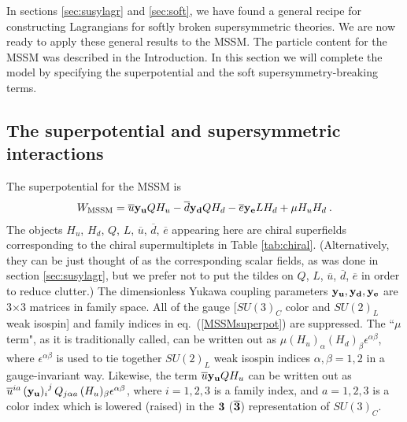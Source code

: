 \documentclass[11pt]{article}
\def\beq{\begin{eqnarray}}
\def\eeq{\end{eqnarray}}
\def\sbar{\overline}
\begin{document}
In sections \ref{sec:susylagr} and \ref{sec:soft}, we have found a general
recipe for constructing Lagrangians for softly broken supersymmetric
theories. We are now ready to apply these general results to the MSSM. The
particle content for the MSSM was described in the Introduction. In this
section we will complete the model by specifying the superpotential and
the soft supersymmetry-breaking terms. 

\subsection{The superpotential and supersymmetric
interactions}\label{subsec:mssm.superpotential}
\setcounter{equation}{0}
\setcounter{footnote}{1}

The superpotential for the MSSM is 
\beq
W_{\rm MSSM} =
\sbar u {\bf y_u} Q H_u -
\sbar d {\bf y_d} Q H_d -
\sbar e {\bf y_e} L H_d +
\mu H_u H_d \> .
\label{MSSMsuperpot}
\eeq
The objects $H_u$, $H_d$, $Q$, $L$, $\sbar u$, $\sbar d$, $\sbar e$
appearing here are chiral superfields corresponding to the chiral
supermultiplets in Table \ref{tab:chiral}.  (Alternatively, they can be
just thought of as the corresponding scalar fields, as was done in section
\ref{sec:susylagr}, but we prefer not to put the tildes on $Q$, $L$,
$\sbar u$, $\sbar d$, $\sbar e$ in order to reduce clutter.) The
dimensionless Yukawa coupling parameters ${\bf y_u}, {\bf y_d}, {\bf y_e}$
are 3$\times 3$ matrices in family space. All of the gauge [$SU(3)_C$
color and $SU(2)_L$ weak isospin] and family indices in
eq.~(\ref{MSSMsuperpot}) are suppressed. The ``$\mu$ term", as it is
traditionally called, can be written out as $\mu (H_u)_\alpha (H_d)_\beta
\epsilon^{\alpha\beta}$, where $\epsilon^{\alpha\beta}$ is used to tie
together $SU(2)_L$ weak isospin indices $\alpha,\beta=1,2$ in a
gauge-invariant way. Likewise, the term $\sbar u {\bf y_u} Q H_u$ can be
written out as $\sbar u^{ia}\, {({\bf y_u})_i}^j\, Q_{j\alpha a}\,
(H_u)_\beta \epsilon^{\alpha \beta}$, where $i=1,2,3$ is a family index,
and $a=1,2,3$ is a color index which is lowered (raised) in the $\bf 3$
($\bf \overline 3$) representation of $SU(3)_C$. 
\end{document}
